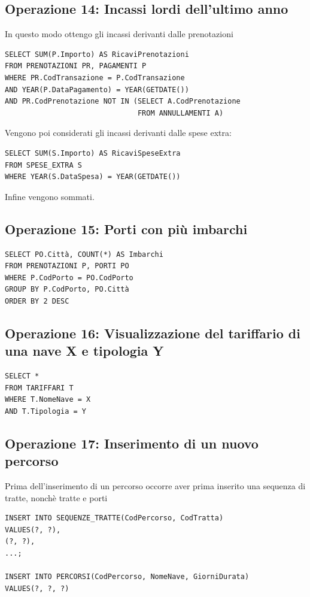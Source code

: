 \documentclass[a4paper, titlepage]{report}
\begin{document}
\newpage
\subsection*{Operazione 14: Incassi lordi dell'ultimo anno}
In questo modo ottengo gli incassi derivanti dalle prenotazioni 
\begin{lstlisting}
SELECT SUM(P.Importo) AS RicaviPrenotazioni
FROM PRENOTAZIONI PR, PAGAMENTI P
WHERE PR.CodTransazione = P.CodTransazione
AND YEAR(P.DataPagamento) = YEAR(GETDATE())
AND PR.CodPrenotazione NOT IN (SELECT A.CodPrenotazione
                               FROM ANNULLAMENTI A)
\end{lstlisting}
Vengono poi considerati gli incassi derivanti dalle spese extra:
\begin{lstlisting}
SELECT SUM(S.Importo) AS RicaviSpeseExtra
FROM SPESE_EXTRA S
WHERE YEAR(S.DataSpesa) = YEAR(GETDATE())
\end{lstlisting}
Infine vengono sommati.

\vspace{0.5cm}
\subsection*{Operazione 15: Porti con più imbarchi}
\begin{lstlisting}
SELECT PO.Città, COUNT(*) AS Imbarchi
FROM PRENOTAZIONI P, PORTI PO
WHERE P.CodPorto = PO.CodPorto
GROUP BY P.CodPorto, PO.Città
ORDER BY 2 DESC
\end{lstlisting}

\vspace{0.5cm}
\subsection*{Operazione 16: Visualizzazione del tariffario di una nave X e tipologia Y}
\begin{lstlisting}
SELECT *
FROM TARIFFARI T
WHERE T.NomeNave = X
AND T.Tipologia = Y
\end{lstlisting}

\vspace{0.5cm}
\subsection*{Operazione 17: Inserimento di un nuovo percorso}
Prima dell'inserimento di un percorso occorre aver prima inserito una sequenza di tratte, nonchè tratte e porti
\begin{lstlisting}
INSERT INTO SEQUENZE_TRATTE(CodPercorso, CodTratta)
VALUES(?, ?),
(?, ?), 
...;

INSERT INTO PERCORSI(CodPercorso, NomeNave, GiorniDurata)
VALUES(?, ?, ?)
\end{lstlisting}
\end{document}
